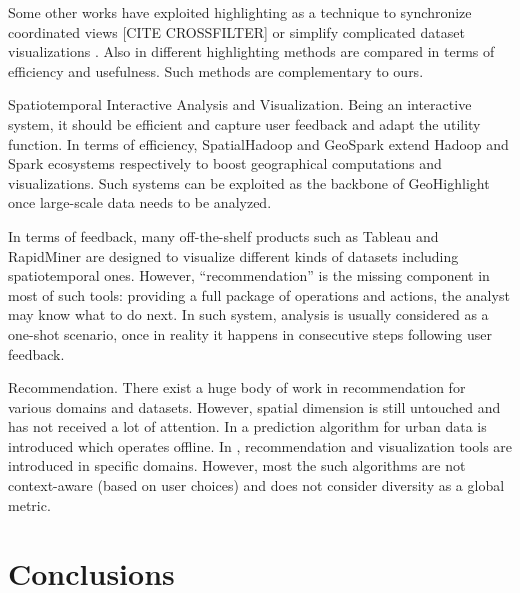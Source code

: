 \documentclass{sig-alternate-05-2015}
\begin{document}
Some other works have exploited highlighting as a technique to synchronize
coordinated views [CITE CROSSFILTER] or simplify complicated dataset
visualizations \cite{Robinson2011,Alper:2011}. Also in \cite{Philipsen}
different highlighting methods are compared in terms of efficiency and usefulness. Such methods are complementary to ours.     

Spatiotemporal Interactive Analysis and Visualization. Being an interactive
system, it should be efficient and capture user feedback and adapt the utility
function. In terms of efficiency, SpatialHadoop \cite{} and GeoSpark \cite{}
extend Hadoop and Spark ecosystems respectively to boost geographical
computations and visualizations. Such systems can be exploited as the backbone
of GeoHighlight once large-scale data needs to be analyzed.      

In terms of feedback, many off-the-shelf products such as Tableau \cite{} and
RapidMiner \cite{} are designed to visualize different kinds of datasets including
spatiotemporal ones. However, ``recommendation'' is the missing component in
most of such tools: providing a full package of operations and actions, the analyst
may know what to do next. In such system, analysis is usually considered as a
one-shot scenario, once in reality it happens in consecutive steps following
user feedback.        

Recommendation. There exist a huge body of work in recommendation
\cite{Adomavicius:2005} for various domains and datasets. However, spatial
dimension is still untouched and has not received a lot of attention. In
\cite{ChirigatiDDF16} a prediction algorithm for urban data is introduced which operates offline. In
\cite{Levandoski:2012,Magdy2014,HendawiKRBTA15a,Bao2015,Magdy:2014},
recommendation and visualization tools are introduced in specific domains.
However, most the such algorithms are not context-aware (based on user choices)
and does not consider diversity as a global metric.    

\section{Conclusions}\label{sec:conclusions}



 
\end{document}
